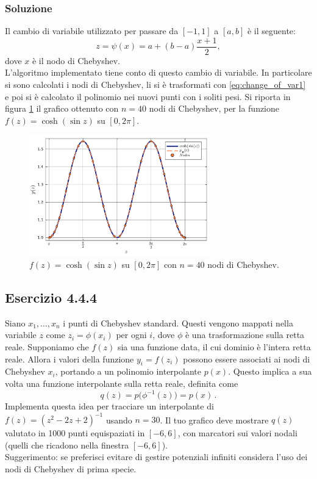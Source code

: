 \documentclass[letterpaper, 12pt]{article}
\numberwithin{equation}{section}    %
\begin{document}
\subsubsection{Soluzione}
Il cambio di variabile utilizzato per passare da $[-1,1]$ a $[a,b]$ è il seguente:
\begin{equation}
    \label{eq:change_of_var1}
    z = \psi(x) = a + (b-a) \frac{x+1}{2},
\end{equation}
dove $x$ è il nodo di Chebyshev. \\
L'algoritmo implementato tiene conto di questo cambio di variabile. In particolare si sono calcolati i nodi 
di Chebyshev, li si è trasformati con \ref{eq:change_of_var1} e poi si è calcolato il polinomio nei nuovi punti con 
i soliti pesi. Si riporta in figura \ref{fig:es4_4_3_1} 
il grafico ottenuto con $n=40$ nodi di Chebyshev, per la funzione $f(z) = \cosh(\sin z)$ su $[0,2\pi]$.
\begin{figure}[!ht]
    \centering
    \includegraphics[width=0.7\textwidth]{4431.pdf}
    \caption{$f(z) = \cosh(\sin z)$ su $[0,2\pi]$ con $n=40$ nodi di Chebyshev.}
    \label{fig:es4_4_3_1}
\end{figure}

\subsection{Esercizio 4.4.4}
Siano $x_1,\ldots,x_n$ i punti di Chebyshev standard. Questi vengono mappati nella variabile $z$ come 
$z_i=\phi(x_i)$ per ogni $i$, dove $\phi$ è una trasformazione sulla retta reale. Supponiamo che $f(z)$ 
sia una funzione data, il cui dominio è l'intera retta reale. Allora i valori della funzione $y_i=f(z_i)$ 
possono essere associati ai nodi di Chebyshev $x_i$, portando a un polinomio interpolante $p(x)$. 
Questo implica a sua volta una funzione interpolante sulla retta reale, definita come
\begin{equation}
    q(z)=p\bigl(\phi^{-1}(z)\bigr) = p(x)\,.
\end{equation}
Implementa questa idea per tracciare un interpolante di $f(z)=(z^2-2z+2)^{-1}$ usando $n=30$. 
Il tuo grafico deve mostrare $q(z)$ valutato in 1000 punti equispaziati in $[-6,6]$, 
con marcatori sui valori nodali (quelli che ricadono nella finestra $[-6,6]$). \\
Suggerimento: se preferisci evitare di gestire potenziali infiniti considera l'uso dei nodi di Chebyshev di 
prima specie.
\end{document}
